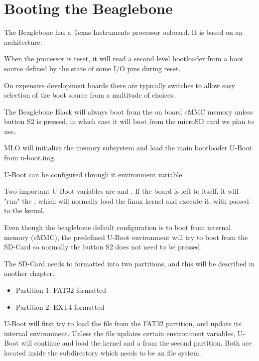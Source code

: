 \section{Booting the Beaglebone}

The Beaglebone has a Texas Instruments  processor onboard.
It is based on an  architecture.

When the processor is reset, it will read a second level bootloader  from a boot source defined by the state of some I/O pins during reset.

On expensive development boards there are typically switches to allow easy selection of the boot source from a multitude of choices.

The Beaglebone Black will always boot from the on board eMMC memory unless button S2 is pressed,
in which case it will boot from the microSD card we plan to use.

MLO will initialize the memory subsystem and load the main bootloader U-Boot from u-boot.img.

U-Boot can be configured through it environment variable.

Two important U-Boot variables are  and .
If the board is left to itself, it will "run" the ,
which will normally load the linux kernel and execute it,
with  passed to the kernel.

Even though the beaglebone default configuration is to boot from internal memory (eMMC),
the predefined U-Boot environment will try to boot from the SD-Card so normally
the button S2 does not need to be pressed.

The SD-Card needs to formatted into two partitions, and this will be described in another chapter.

\begin{itemize}

\item Partition 1: FAT32 formatted

\item Partition 2: EXT4 formatted

\end{itemize}


U-Boot will first try to load the file  from the FAT32 partition,
and update its internal environment.
Unless the file updates certain environment variables,
U-Boot will continue and load the kernel  and a 
from the second partition. Both are located inside the  subdirectory which
needs to be an  file system.

